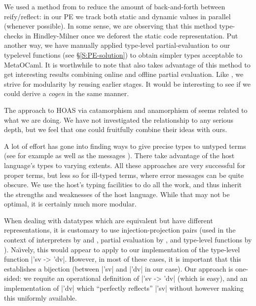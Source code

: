 \documentclass[preprint]{sigplanconf}
\begin{document}
We used a method from \citet{asai-binding-time} to reduce the amount
of back-and-forth between reify/reflect: in our PE we track both
static and dynamic values in parallel (whenever possible).  In some sense,
we are observing that this method type-checks in Hindley-Milner once we
deforest the static code representation.  Put another way, we have
manually applied type-level partial-evaluation to our typelevel 
functions (see \S\ref{S:PE-solution}) to obtain simpler types 
acceptable to MetaOCaml.  It is worthwhile to note that 
\citet{sumii-hybrid} also takes advantage of this method
\citep[of][]{asai-binding-time} to get interesting results combining online
and offline partial evaluation.  Like \citet{SperberThiemann:TwoForOne},
we strive for modularity by reusing earlier stages.  It would be interesting
to see if we could derive a \emph{cogen} \citep{Thiemann:cogeninsixlines}
in the same manner.

The approach to HOAS via catamorphism and anamorphism of
\citet{Washburn-Weirich-boxes} seems related to what we are doing.
We have not investigated the relationship to any serious depth, but we
feel that one could fruitfully combine their ideas with ours.

A lot of effort has gone into finding ways to give precise types to untyped
terms (see for example \citet{baars-typing,Guillemette-Monier-PLPV}
as well as the messages \citet{haskell-list}).  There 
take advantage of the host language's types to varying extents.  All 
these approaches are very successful for proper terms, but less so for
ill-typed terms, where error messages can be quite obscure.  We use the
host's typing facilities to do all the work, and thus inherit the strengths
and weaknesses of the host language.  While that may not be optimal, it is
certainly much more modular.

When dealing with datatypes which are equivalent but have different
representations, it is customary to use injection-projection pairs
(used in the context of interpreters by \citet{Ramsey-ML-module-mania}
and \citet{Benton-embedded-interpreters}, partial evaluation by
\citet{Danvy-TDPE}, and type-level functions by
\citet{oliveira-typecase}).  Na\"{\i}vely, this would appear to apply to
our implementation of the type-level function |'sv -> 'dv|.  However, in most
of these cases, it is important that this establishes a bijection (between
|'sv| and |'dv| in our case).  Our approach is one-sided: we requite
an operational definition of |'sv -> 'dv| (which is easy), and an
implementation of |'dv| which ``perfectly reflects'' |'sv| without 
however making this uniformly available.
\end{document}

